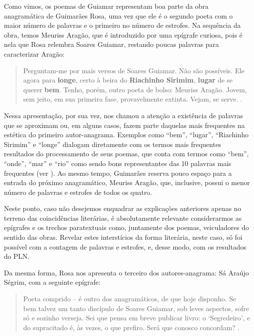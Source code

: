 \documentclass[portuguese]{textolivre}
\begin{document}
Como vimos, os poemas de Guiamar representam boa parte da obra anagramática de Guimarães Rosa, uma vez que ele é o segundo poeta com o maior número de palavras e o primeiro no número de estrofes. Na sequência da obra, temos Meuriss Aragão, que é introduzido por uma epígrafe curiosa, pois é nela que Rosa relembra Soares Guiamar, restando poucas palavras para caracterizar Aragão: 

\begin{quote}
    Perguntam-me por mais versos de Soares Guiamar. Não são possíveis. Ele agora para \textbf{longe}, certo à beira do \textbf{Riachinho Sirimim}, \textbf{lugar} de se querer \textbf{bem}. Tenho, porém, outro poeta de bolso: Meuriss Aragão. Jovem, sem jeito, em sua primeira fase, provavelmente extinta. Vejam, se serve. \cite[p. 90, grifos nossos]{rosa_ave_1985}.
\end{quote}

Nessa apresentação, por sua vez, nos chamou a atenção a existência de palavras que se aproximam ou, em alguns casos, fazem parte daquelas mais frequentes na estética do primeiro autor-anagrama. Exemplos como “bem”, “lugar”, “Riachinho Sirimim” e “longe” dialogam diretamente com os termos mais frequentes resultados do processamento de seus poemas, que conta com termos como “bem”, “onde”, “mar” e “rio” como sendo bons representantes das 10 palavras mais frequentes (ver ). Ao mesmo tempo, Guimarães reserva pouco espaço para a entrada do próximo anagramático, Meuriss Aragão, que, inclusive, possui o menor número de palavras e estrofes de todos os quatro.

Neste ponto, caso não desejemos enquadrar as explicações anteriores apenas no terreno das coincidências literárias, é absolutamente relevante considerarmos as epígrafes e os trechos paratextuais como, juntamente dos poemas, veiculadores do sentido das obras. Revelar estes interstícios da forma literária, neste caso, só foi possível com a contagem de palavras e estrofes, e, desse modo, com os resultados do PLN. 

Da mesma forma, Rosa nos apresenta o terceiro dos autores-anagrama: Sá Araújo Ségrim, com a seguinte epígrafe:

\begin{quote}
    Poeta comprido – é outro dos anagramáticos, de que hoje disponho. Se bem talvez um tanto discípulo de Soares Guiamar, sob leves aspectos, sofre só e sozinho verseja. Sei que pensa em breve publicar livro: o ‘Segredeiro’, e do supracitado é, às vezes, o que prefiro. Será que conosco concordam? \cite[p. 112]{rosa_ave_1985}.
\end{quote}
\end{document}

